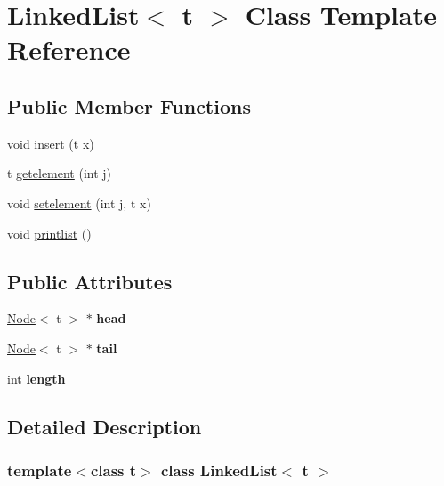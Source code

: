 \hypertarget{classLinkedList}{}\section{Linked\+List$<$ t $>$ Class Template Reference}
\label{classLinkedList}
\subsection*{Public Member Functions}
\begin{DoxyCompactItemize}
\item 
void \hyperlink{classLinkedList_a78c01c1f298ae68de1f090649faa36a7}{insert} (t x)
\item 
t \hyperlink{classLinkedList_aca15dfd242beef3db4fbff0df1571043}{getelement} (int j)
\item 
void \hyperlink{classLinkedList_a8b4f7e75614ba2adc39d51fd07ee7b63}{setelement} (int j, t x)
\item 
void \hyperlink{classLinkedList_a092b84e1a84706565ebd77ab5b01149c}{printlist} ()
\end{DoxyCompactItemize}
\subsection*{Public Attributes}
\begin{DoxyCompactItemize}
\item 
\mbox{\label{classLinkedList_a6c4d716a8840827865c3244060f6222c}} 
\hyperlink{classNode}{Node}$<$ t $>$ $\ast$ {\bfseries head}
\item 
\mbox{\label{classLinkedList_afa61e48544f4dba58f1dc71502bf9ba7}} 
\hyperlink{classNode}{Node}$<$ t $>$ $\ast$ {\bfseries tail}
\item 
\mbox{\label{classLinkedList_aa5d905e4818ec6a2d1fe8321a4231fdd}} 
int {\bfseries length}
\end{DoxyCompactItemize}


\subsection{Detailed Description}
\subsubsection*{template$<$class t$>$\newline
class Linked\+List$<$ t $>$}

